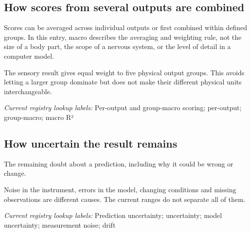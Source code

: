 \begin{samepage}
\subsection*{How scores from several outputs are combined}
\noindent Scores can be averaged across individual outputs or first combined within defined groups. In this entry, macro describes the averaging and weighting rule, not the size of a body part, the scope of a nervous system, or the level of detail in a computer model.\par
\end{samepage}
\begin{samepage}
\noindent The sensory result gives equal weight to five physical output groups. This avoids letting a larger group dominate but does not make their different physical units interchangeable.\par\nopagebreak[4]

\end{samepage}


\noindent\textit{Current registry lookup labels:} Per-output and group-macro scoring; per-output; group-macro; macro R²\par

\begin{samepage}
\subsection*{How uncertain the result remains}
\noindent The remaining doubt about a prediction, including why it could be wrong or change.\par
\end{samepage}
\begin{samepage}
\noindent Noise in the instrument, errors in the model, changing conditions and missing observations are different causes. The current ranges do not separate all of them.\par\nopagebreak[4]

\end{samepage}


\noindent\textit{Current registry lookup labels:} Prediction uncertainty; uncertainty; model uncertainty; measurement noise; drift\par

